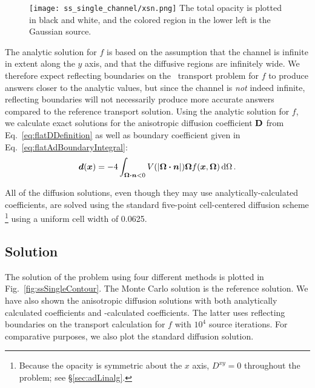 
\begin{figure}[htb]
  \centering
  \texttt{[image: ss\_single\_channel/xsn.png]}
  {The total opacity is plotted in black and white, and the colored region in the
  lower left is the Gaussian source.}
  \label{fig:ssSingleXsn}
\end{figure}

The analytic solution for $f$ is based on the assumption that the channel is
infinite in extent along the $y$ axis, and that the diffusive regions are
infinitely wide. We therefore expect reflecting boundaries on the \SN\ transport
problem for $f$ to produce answers closer to the analytic values, but since the
channel is \emph{not} indeed infinite, reflecting boundaries will not
necessarily produce more accurate answers compared to the reference transport
solution. Using the analytic solution for $f$, we calculate exact solutions for
the anisotropic diffusion coefficient $\mathbf{D}$ from
Eq.~\eqref{eq:flatDDefinition}
as well as boundary coefficient given in Eq.~\eqref{eq:flatAdBoundaryIntegral}:
\begin{equation*}
  \bm{d}(\bm{x}) = -4\int_{\bm{\Omega}\bm{\cdot}\bm{n} < 0}
  V(\left| \bm{\Omega}\bm{\cdot}\bm{n} \right|)
\bm{\Omega} f(\bm{x}, \bm{\Omega}) \mathop{}\!\mathrm{d}\Omega\,.
\end{equation*}

All of the diffusion solutions, even though they may use analytically-calculated
coefficients, are solved using the standard five-point cell-centered diffusion
scheme%
\footnote{%
Because the opacity is symmetric about the $x$ axis, $D^{xy}=0$
throughout the problem; see \S\ref{sec:adLinalg}.
} using a uniform cell width of 0.0625.

\subsection{Solution}
The solution of the problem using four different methods is plotted in
Fig.~\ref{fig:ssSingleContour}. The Monte Carlo solution is the reference
solution.  We have also shown the anisotropic diffusion solutions with
both analytically calculated coefficients and \SN-calculated coefficients. The
latter uses reflecting boundaries on the transport calculation for $f$ with
$10^4$ source iterations. For comparative purposes, we also plot the standard
diffusion solution.

